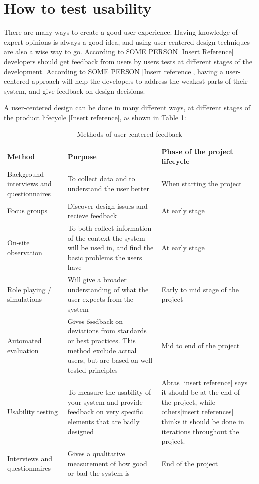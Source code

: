 \section{How to test usability}
There are many ways to create a good user experience. Having knowledge of expert opinions is always a good idea, and using user-centered design techniques are also a wise way to go. According to SOME PERSON [Insert Reference] developers should get feedback from users by users tests at different stages of the development. According to SOME PERSON [Insert reference], having a user-centered approach will help the developers to address the weakest parts of their system, and give feedback on design decisions. 

A user-centered design can be done in many different ways, at different stages of the product lifecycle [Insert reference], as shown in Table \ref{table:designduringlifecycle}:

\begin{table}[H]
\begin{tabular}{|p{5cm} | p{5cm} | p{5cm} |}
\hline
\textbf{Method} & \textbf{Purpose} & \textbf{Phase of the project lifecycle} \\ \hline
Background interviews and questionnaires & To collect data and to understand the user better & When starting the project \\ \hline
Focus groups & Discover design issues and recieve feedback & At early stage \\ \hline
On-site observation & To both collect information of the context the system will be used in, and find the basic problems the users have & At early stage \\ \hline
Role playing / simulations & Will give a broader understanding of what the user expects from the system & Early to mid stage of the project \\ \hline
Automated evaluation & Gives feedback on deviations from standards or best practices. This method exclude actual users, but are based on well tested principles & Mid to end of the project \\ \hline
Usability testing & To measure the usability of your system and provide feedback on very specific elements that are badly designed & Abras [insert reference] says it should be at the end of the project, while others[insert references] thinks it should be done in iterations throughout the project. \\ \hline
Interviews and questionnaires & Gives a qualitative measurement of how good or bad the system is & End of the project \\ \hline
\end{tabular}
\caption{Methods of user-centered feedback}
\label{table:designduringlifecycle}
\end{table}

